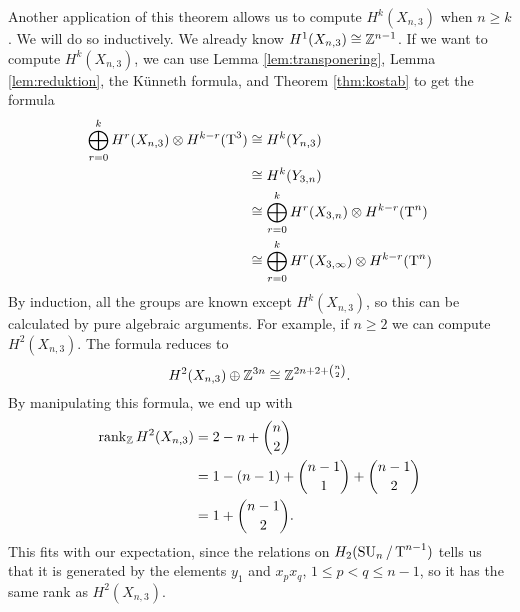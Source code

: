 \begin{example}
  Another application of this theorem allows us to compute
  $H^k(X_{n,3})$ when $n \geq k$. We will do so inductively. We
  already know $H^1(X_{n,3}) \cong \mathbb{Z}^{n-1}$. If we want to compute
  $H^k(X_{n,3})$, we can use Lemma \ref{lem:transponering}, Lemma
  \ref{lem:reduktion}, the K\"unneth formula, and Theorem
  \ref{thm:kostab} to get the formula
  \begin{align*}
    \bigoplus_{r=0}^k H^r(X_{n,3}) \otimes H^{k-r}(\operatorname{T}^3) 
    &\cong H^k(Y_{n,3}) \\
    &\cong H^k(Y_{3,n}) \\
    &\cong \bigoplus_{r=0}^k H^r(X_{3,n}) \otimes H^{k-r}(\operatorname{T}^n) \\
    &\cong \bigoplus_{r=0}^k H^r(X_{3,\infty}) \otimes H^{k-r}(\operatorname{T}^n)
  \end{align*}
  By induction, all the groups are known except $H^k(X_{n,3})$, so
  this can be calculated by pure algebraic arguments. For example, if
  $n \geq 2$ we can compute $H^2(X_{n,3})$. The formula reduces to
  \[ H^2(X_{n,3}) \oplus \mathbb{Z}^{3n} \cong \mathbb{Z}^{2n+2+{n\choose 2}}. \]
  By manipulating this formula, we end up with
  \begin{align*}
    \operatorname{rank}_{\mathbb{Z}} H^2(X_{n,3}) &= 2 - n + {n\choose 2} \\
                        &= 1 - (n-1) + {n-1 \choose 1} + {n-1 \choose
                          2} \\
                        &= 1 + {n-1 \choose 2}.
  \end{align*}
  This fits with our expectation, since the relations on
  $H_2(\operatorname{SU}_{n}/\operatorname{T}^{n-1})$
  tells us that it is generated by the elements $y_1$ and $x_p x_q$,
  $1\leq p<q\leq n-1$, so it has the same rank as $H^2(X_{n,3})$.
\end{example}

